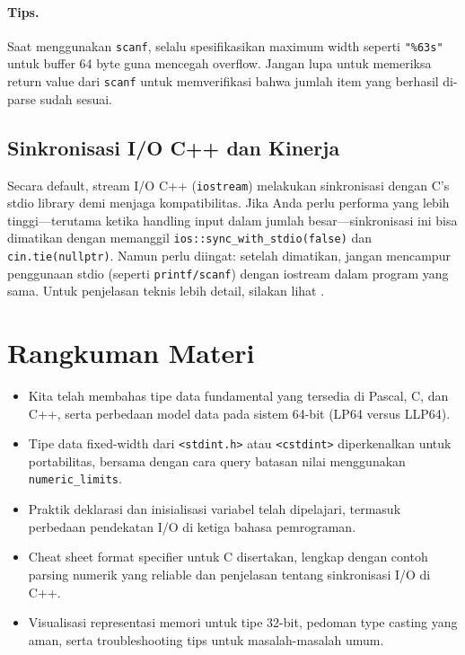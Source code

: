 \documentclass[../main.tex]{subfiles}
\begin{document}
\paragraph{Tips.} Saat menggunakan \texttt{scanf}, selalu spesifikasikan maximum width seperti \texttt{"\%63s"} untuk buffer 64 byte guna mencegah overflow. Jangan lupa untuk memeriksa return value dari \texttt{scanf} untuk memverifikasi bahwa jumlah item yang berhasil di-parse sudah sesuai.

\subsection{Sinkronisasi I/O C++ dan Kinerja}
Secara default, stream I/O C++ (\texttt{iostream}) melakukan sinkronisasi dengan C's stdio library demi menjaga kompatibilitas. Jika Anda perlu performa yang lebih tinggi—terutama ketika handling input dalam jumlah besar—sinkronisasi ini bisa dimatikan dengan memanggil \texttt{ios::sync\_\allowbreak{}with\_\allowbreak{}stdio(false)} dan \texttt{cin.tie(nullptr)}. Namun perlu diingat: setelah dimatikan, jangan mencampur penggunaan stdio (seperti \texttt{printf/scanf}) dengan iostream dalam program yang sama. Untuk penjelasan teknis lebih detail, silakan lihat \parencite{cpp-sync-with-stdio}.

\section{Rangkuman Materi}
\begin{itemize}
  \item Kita telah membahas tipe data fundamental yang tersedia di Pascal, C, dan C++, serta perbedaan model data pada sistem 64-bit (LP64 versus LLP64).
  \item Tipe data fixed-width dari \texttt{<stdint.h>} atau \texttt{<cstdint>} diperkenalkan untuk portabilitas, bersama dengan cara query batasan nilai menggunakan \texttt{numeric\_limits}.
  \item Praktik deklarasi dan inisialisasi variabel telah dipelajari, termasuk perbedaan pendekatan I/O di ketiga bahasa pemrograman.
  \item Cheat sheet format specifier untuk C disertakan, lengkap dengan contoh parsing numerik yang reliable dan penjelasan tentang sinkronisasi I/O di C++.
  \item Visualisasi representasi memori untuk tipe 32-bit, pedoman type casting yang aman, serta troubleshooting tips untuk masalah-masalah umum.
\end{itemize}
\end{document}
